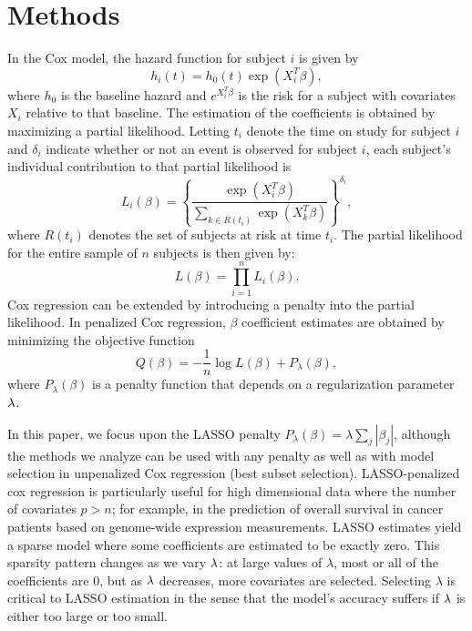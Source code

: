 \section{Methods}
\label{Sec:methods}

\par In the Cox model, the hazard function for subject $i$ is given by 
\begin{equation*}
  h_{i}(t) = h_{0}(t) \exp( X_{i}^{T} \beta),
\end{equation*} 
where $h_{0}$ is the baseline hazard and $e^{X_i^{T} \beta}$ is the risk for a subject with covariates $X_i$ relative to that baseline.  The estimation of the coefficients is obtained by maximizing a partial likelihood.  Letting $t_i$ denote the time on study for subject $i$ and $\delta_{i}$ indicate whether or not an event is observed for subject $i$, each subject's individual contribution to that partial likelihood is
\begin{equation}
  \label{eq:cox-pl-subj}
  L_{i}(\beta) = \left \{\frac{\exp ( X_{i}^{T} \beta)}{\sum_{ k \in R(t_{i})}\exp ( X_{k}^{T} \beta)}\right \}^{\delta_{i}},
\end{equation}
where $R(t_{i})$ denotes the set of subjects at risk at time $t_{i}$.  The partial likelihood for the entire sample of $n$ subjects is then given by:
\begin{equation}
  \label{eq:cox-pl-sum}
  L(\beta) =\prod_{i = 1}^{n} L_{i}(\beta).
\end{equation}
Cox regression can be extended by introducing a penalty into the partial likelihood.  In penalized Cox regression, $\beta$ coefficient estimates are obtained by minimizing the objective function
\begin{equation}
  \label{eq:obj}
  Q(\beta) = - \frac{1}{n} \log L(\beta) + P_{\lambda}(\beta),
\end{equation}
where $P_{\lambda}(\beta)$ is a penalty function that depends on a regularization parameter $\lambda$.

\par In this paper, we focus upon the LASSO penalty $P_{\lambda}(\beta) = \lambda \sum_{j} |\beta_{j}|$, although the methods we analyze can be used with any penalty as well as with model selection in unpenalized Cox regression (best subset selection). LASSO-penalized cox regression is particularly useful for high dimensional data where the number of covariates $p > n$; for example, in the prediction of overall survival in cancer patients based on genome-wide expression measurements. LASSO estimates yield a sparse model where some coefficients are estimated to be exactly zero. This sparsity pattern changes as we vary $\lambda$: at large values of $\lambda$, most or all of the coefficients are 0, but as $\lambda$ decreases, more covariates are selected. Selecting $\lambda$ is critical to LASSO estimation in the sense that the model's accuracy suffers if $\lambda$ is either too large or too small.

